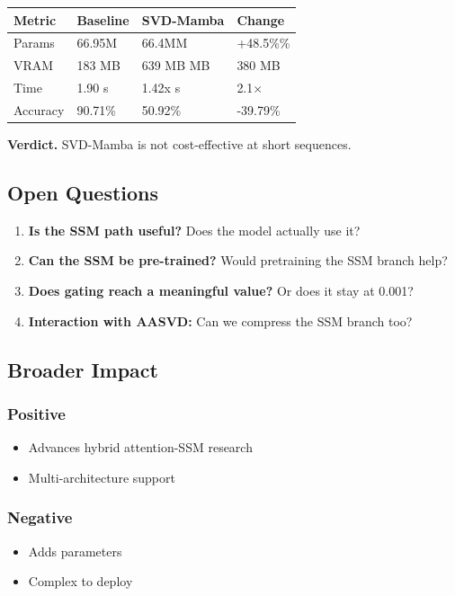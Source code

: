 \begin{table}[H]
\centering
\small
\begin{tabular}{llll}
\toprule
\textbf{Metric} & \textbf{Baseline} & \textbf{SVD-Mamba} & \textbf{Change} \\
\midrule
Params & 66.95M & 66.4MM & +48.5\%\% \\
VRAM & 183 MB & 639 MB MB & 380 MB \\
Time & 1.90 s & 1.42x s & 2.1$\times$ \\
Accuracy & 90.71\% & 50.92\% & -39.79\% \\
\bottomrule
\end{tabular}
\end{table}

\textbf{Verdict.} SVD-Mamba is not cost-effective at short sequences.

\subsection{Open Questions}

\begin{enumerate}
\item \textbf{Is the SSM path useful?} Does the model actually use it?
\item \textbf{Can the SSM be pre-trained?} Would pretraining the SSM branch
  help?
\item \textbf{Does gating reach a meaningful value?} Or does it stay at 0.001?
\item \textbf{Interaction with AASVD:} Can we compress the SSM branch too?

\end{enumerate}
\subsection{Broader Impact}

\subsubsection{Positive}
\begin{itemize}
\item Advances hybrid attention-SSM research
\item Multi-architecture support

\end{itemize}
\subsubsection{Negative}
\begin{itemize}
\item Adds parameters
\item Complex to deploy

\end{itemize}
